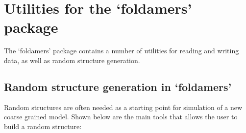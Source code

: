 \documentclass[letterpaper,12pt,english,openany,oneside]{sphinxmanual}
\begin{document}
\chapter{Utilities for the ‘foldamers’ package}
\label{\detokenize{utilities:utilities-for-the-foldamers-package}}\label{\detokenize{utilities::doc}}
The ‘foldamers’ package contains a number of utilities for reading and writing data, as well as random structure generation.


\section{Random structure generation in ‘foldamers’}
\label{\detokenize{utilities:random-structure-generation-in-foldamers}}
Random structures are often needed as a starting point for simulation of a new coarse grained model.  Shown below are the main tools that allows the user to build a random structure:

\label{\detokenize{utilities:module-utilities.util}}
\end{document}
